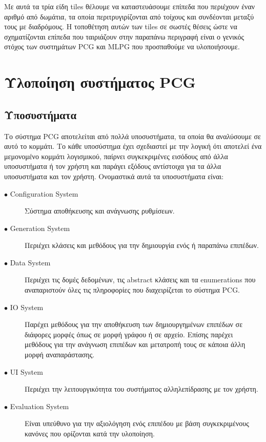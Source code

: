 Με αυτά τα τρία είδη tiles θέλουμε να καταστευάσουμε επίπεδα που περιέχουν έναν αριθμό από δωμάτια, τα οποία περιτρυγιρίζονται από τοίχους και συνδέονται μεταξύ τους με διαδρόμους. Η τοποθέτηση αυτών των tiles σε σωστές θέσεις ώστε να σχηματίζονται επίπεδα που ταιριάζουν στην παραπάνω περιγραφή είναι ο γενικός στόχος των συστημάτων PCG και MLPG που προσπαθούμε να υλοποιήσουμε.

\section{Υλοποίηση συστήματος PCG}

\subsection{Υποσυστήματα}
Το σύστημα PCG αποτελείται από πολλά υποσυστήματα, τα οποία θα αναλύσουμε σε αυτό το κομμάτι. Το κάθε υποσύστημα έχει σχεδιαστεί με την λογική ότι αποτελεί ένα μεμονομένο κομμάτι λογισμικού, παίρνει συγκεκριμένες εισόδους από άλλα υποσυστήματα ή τον χρήστη και παράγει εξόδους αντίστοιχα για τα άλλα υποσυστήματα και τον χρήστη. Ονομαστικά αυτά τα υποσυστήματα είναι:

\begin{description}
\item[$\bullet$ Configuration System] Σύστημα αποθήκευσης και ανάγνωσης ρυθμίσεων.
\item[$\bullet$ Generation System] Περιέχει κλάσεις και μεθόδους για την δημιουργία ενός ή παραπάνω επιπέδων.
\item[$\bullet$ Data System] Περιέχει τις δομές δεδομένων, τις abstract κλάσεις και τα enumerations που αναπαριστούν όλες τις πληροφορίες που διαχειρίζεται το σύστημα PCG.
\item[$\bullet$ ΙΟ System] Παρέχει μεθόδους για την αποθήκευση των δημιουργημένων επιπέδων σε διάφορες μορφές όπως σε μορφή γράφου ή σε αρχείο. Επίσης παρέχει μεθόδους για την ανάγνωση επιπέδων και μετατροπή τους σε κάποια άλλη μορφή αναπαράστασης.
\item[$\bullet$ UI System] Περιέχει την λειτουργικότητα του συστήματος αλληλεπίδρασης με τον χρήστη.
\item[$\bullet$ Evaluation System] Είναι υπεύθυνο για την αξιολόγηση ενός επιπέδου με βάση συγκεκριμένους κανόνες που ορίζονται κατά την υλοποίηση.
\end{description}

